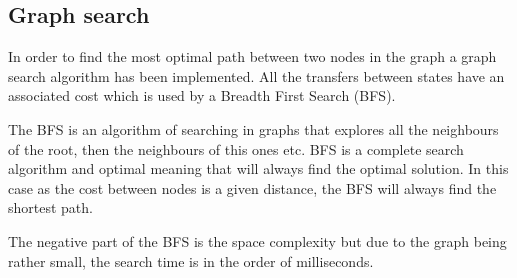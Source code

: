 	

    \subsection{Graph search} %
    \label{sub:mr_graph_search}
    In order to find the most optimal path between two nodes in the graph a graph search algorithm has been implemented.
    All the transfers between states have an associated cost which is used by a Breadth First Search (BFS).

    The BFS is an algorithm of searching in graphs that explores all the neighbours of the root, then the neighbours of this ones etc.
    BFS is a complete search algorithm and optimal meaning that will always find the optimal solution.
    In this case as the cost between nodes is a given distance, the BFS will always find the shortest path.
    
    The negative part of the BFS is the space complexity but due to the graph being rather small, the search time is in the order of milliseconds.
